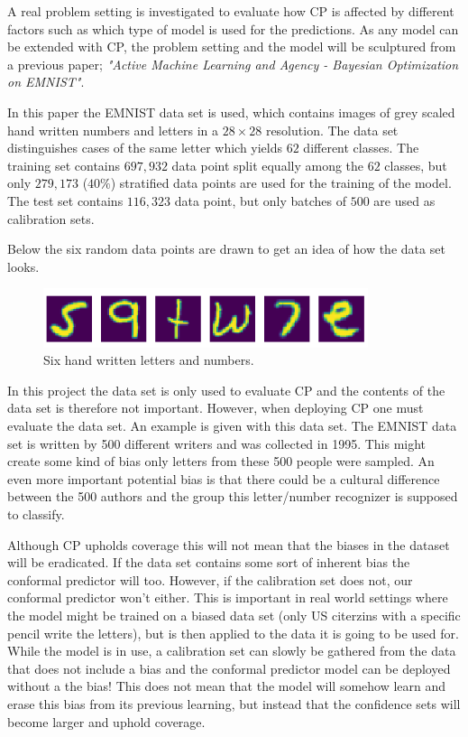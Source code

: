 A real problem setting is investigated to evaluate how CP is affected by different factors such as which type of model is used for the predictions. As any model can be extended with CP, the problem setting and the model will be sculptured from a previous paper; \textit{"Active Machine Learning and Agency - Bayesian Optimization on EMNIST"}. 

In this paper the EMNIST data set is used, which contains images of grey scaled hand written numbers and letters in a $28 \times 28$ resolution. The data set distinguishes cases of the same letter which yields $62$ different classes. The training set contains $697,932$ data point split equally among the $62$ classes, but only $279,173$ ($40\%$) stratified data points are used for the training of the model. The test set contains $116,323$ data point, but only batches of $500$ are used as calibration sets.  

Below the six random data points are drawn to get an idea of how the data set looks. 

\begin{figure}[H]
    \centering
    \includegraphics[width=0.85\textwidth]{Images/letters_clipped.png}
    \caption{Six hand written letters and numbers.}
    \label{fig:cnn_architecture}
\end{figure}

In this project the data set is only used to evaluate CP and the contents of the data set is therefore not important. However, when deploying CP one must evaluate the data set. An example is given with this data set. The EMNIST data set is written by 500 different writers and was collected in 1995. This might create some kind of bias only letters from these 500 people were sampled. An even more important potential bias is that there could be a cultural difference between the 500 authors and the group this letter/number recognizer is supposed to classify. 

Although CP upholds coverage this will not mean that the biases in the dataset will be eradicated. If the data set contains some sort of inherent bias the conformal predictor will too. However, if the calibration set does not, our conformal predictor won’t either. This is important in real world settings where the model might be trained on a biased data set (only US citerzins with a specific pencil write the letters), but is then applied to the data it is going to be used for. While the model is in use, a calibration set can slowly be gathered from the data that does not include a bias and the conformal predictor model can be deployed without a the bias! This does not mean that the model will somehow learn and erase this bias from its previous learning, but instead that the confidence sets will become larger and uphold coverage. 